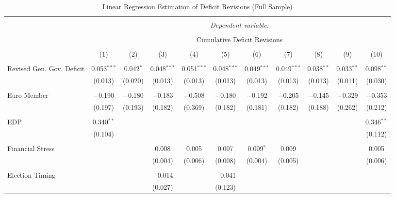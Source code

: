 \begin{table}[!htbp] \centering 
  \caption{Linear Regression Estimation of Deficit Revisions (Full Sample)} 
  \label{deficit_results} 
\tiny 
\begin{tabular}{@{\extracolsep{5pt}}lcccccccccc} 
\\[-1.8ex]\hline 
\hline \\[-1.8ex] 
 & \multicolumn{10}{c}{\textit{Dependent variable:}} \\ 
\cline{2-11} 
\\[-1.8ex] & \multicolumn{10}{c}{Cumulative Deficit Revisions} \\ 
\\[-1.8ex] & (1) & (2) & (3) & (4) & (5) & (6) & (7) & (8) & (9) & (10)\\ 
\hline \\[-1.8ex] 
 Revised Gen. Gov. Deficit & 0.053$^{***}$ & 0.042$^{*}$ & 0.048$^{***}$ & 0.051$^{***}$ & 0.048$^{***}$ & 0.049$^{***}$ & 0.049$^{***}$ & 0.038$^{**}$ & 0.033$^{**}$ & 0.098$^{**}$ \\ 
  & (0.013) & (0.020) & (0.013) & (0.013) & (0.013) & (0.013) & (0.013) & (0.013) & (0.011) & (0.030) \\ 
  & & & & & & & & & & \\ 
 Euro Member & $-$0.190 & $-$0.180 & $-$0.183 & $-$0.508 & $-$0.180 & $-$0.192 & $-$0.205 & $-$0.145 & $-$0.329 & $-$0.353 \\ 
  & (0.197) & (0.193) & (0.182) & (0.369) & (0.182) & (0.181) & (0.182) & (0.188) & (0.262) & (0.212) \\ 
  & & & & & & & & & & \\ 
 EDP & 0.340$^{**}$ &  &  &  &  &  &  &  &  & 0.346$^{**}$ \\ 
  & (0.104) &  &  &  &  &  &  &  &  & (0.112) \\ 
  & & & & & & & & & & \\ 
 Financial Stress &  &  & 0.008 & 0.005 & 0.007 & 0.009$^{*}$ & 0.009 &  &  & 0.005 \\ 
  &  &  & (0.004) & (0.006) & (0.008) & (0.004) & (0.005) &  &  & (0.006) \\ 
  & & & & & & & & & & \\ 
 Election Timing &  &  & $-$0.014 &  & $-$0.041 &  &  &  &  &  \\ 
  &  &  & (0.027) &  & (0.123) &  &  &  &  &  \\ 

\end{tabular}
\end{table}

